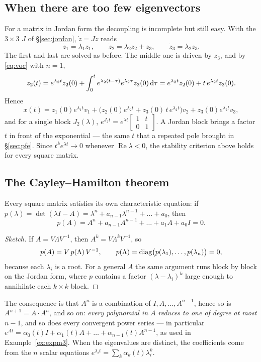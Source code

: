 \documentclass[11pt]{article}
\begin{document}
\subsection{When there are too few eigenvectors}\label{sec:jordanresp}
For a matrix in Jordan form the decoupling is incomplete but still easy. With the
$3\times3$ $J$ of \S\ref{sec:jordan}, $\dot z=Jz$ reads
\[
   \dot z_1=\lambda_1z_1,\qquad \dot z_2=\lambda_2z_2+z_3,\qquad \dot z_3=\lambda_2z_3 .
\]
The first and last are solved as before. The middle one is driven by $z_3$, and by
\eqref{eq:voc} with $n=1$,
\[
   z_2(t) = e^{\lambda_2t}z_2(0)+\int_0^{t}e^{\lambda_2(t-\tau)}e^{\lambda_2\tau}z_3(0)\,\mathrm{d}\tau
          = e^{\lambda_2t}z_2(0) + t\,e^{\lambda_2t}z_3(0).
\]
Hence
\[
   x(t) = z_1(0)e^{\lambda_1t}v_1 + \bigl(z_2(0)e^{\lambda_2t}+z_3(0)\,t\,e^{\lambda_2t}\bigr)v_2
          + z_3(0)e^{\lambda_2t}v_3 ,
\]
and for a single block $J_2(\lambda)$, $e^{J_2t}=e^{\lambda t}\begin{bmatrix}1&t\\0&1\end{bmatrix}$.
A Jordan block brings a factor $t$ in front of the exponential --- the same $t$
that a repeated pole brought in \S\ref{sec:pfe}. Since $t^{k}e^{\lambda t}\to0$
whenever $\operatorname{Re}\lambda<0$, the stability criterion above holds for
every square matrix.

\subsection{The Cayley--Hamilton theorem}\label{sec:cayley}
\begin{theorem}
Every square matrix satisfies its own characteristic equation: if
$p(\lambda)=\det(\lambda I-A)=\lambda^{n}+a_{n-1}\lambda^{n-1}+\dots+a_0$, then
\[
   p(A) = A^{n}+a_{n-1}A^{n-1}+\dots+a_1A+a_0I = 0 .
\]
\end{theorem}
\begin{proof}[Sketch]
If $A=V\Lambda V^{-1}$, then $A^{k}=V\Lambda^{k}V^{-1}$, so
\[
   p(A)=V\,p(\Lambda)\,V^{-1},\qquad
   p(\Lambda)=\operatorname{diag}\bigl(p(\lambda_1),\dots,p(\lambda_n)\bigr)=0,
\]
because each $\lambda_i$ is a root. For a general $A$ the same argument runs block by block on
the Jordan form, where $p$ contains a factor $(\lambda-\lambda_i)^{k}$ large enough
to annihilate each $k\times k$ block.
\end{proof}
The consequence is that $A^{n}$ is a combination of $I,A,\dots,A^{n-1}$, hence so is
$A^{n+1}=A\cdot A^{n}$, and so on: \emph{every polynomial in $A$ reduces to one of
degree at most $n-1$}, and so does every convergent power series --- in particular
$e^{At}=\alpha_0(t)I+\alpha_1(t)A+\dots+\alpha_{n-1}(t)A^{n-1}$, as used in
Example~\ref{ex:expm3}. When the eigenvalues are distinct, the coefficients come
from the $n$ scalar equations $e^{\lambda_it}=\sum_k\alpha_k(t)\lambda_i^{k}$.
\end{document}
